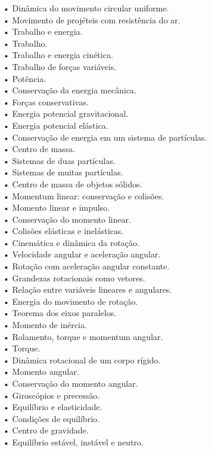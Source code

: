 {• Dinâmica do movimento circular uniforme.\\
• Movimento de projéteis com resistência do ar.\\
• Trabalho e energia.\\
• Trabalho.\\
• Trabalho e energia cinética.\\
• Trabalho de forças variáveis.\\
• Potência.\\
• Conservação da energia mecânica.\\
• Forças conservativas.\\
• Energia potencial gravitacional.\\
• Energia potencial elástica.\\
• Conservação de energia em um sistema de partículas.\\
• Centro de massa.\\
• Sistemas de duas partículas.\\
• Sistemas de muitas partículas.\\
• Centro de massa de objetos sólidos.\\
• Momentum linear: conservação e colisões.\\
• Momento linear e impulso.\\
• Conservação do momento linear.\\
• Colisões elásticas e inelásticas.\\
• Cinemática e dinâmica da rotação.\\
• Velocidade angular e aceleração angular.\\
• Rotação com aceleração angular constante.\\
• Grandezas rotacionais como vetores.\\
• Relação entre variáveis lineares e angulares.\\
• Energia do movimento de rotação.\\
• Teorema dos eixos paralelos.\\
• Momento de inércia.\\
• Rolamento, torque e momentum angular.\\
• Torque.\\
• Dinâmica rotacional de um corpo rígido.\\
• Momento angular.\\
• Conservação do momento angular.\\
• Giroscópios e precessão.\\
• Equilíbrio e elasticidade.\\
• Condições de equilíbrio.\\
• Centro de gravidade.\\
• Equilíbrio estável, instável e neutro.\\
}


